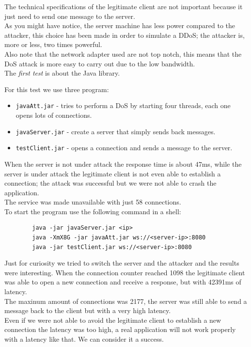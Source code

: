 	The technical specifications of the legitimate client are not important because it just need to send one message to the server.\\
	As you might have notice, the server machine has less power compared to the attacker, this choice has been made in order to simulate a DDoS;
	the attacker is, more or less, two times powerful.\\
	Also note that the network adapter used are not top notch, this means that the DoS attack is more easy to carry out due to the low bandwidth.\\

	The \emph{first test} is about the Java library.

	For this test we use three program:
	\begin{itemize}
		\item \texttt{javaAtt.jar} - tries to perform a DoS by starting four threads, each one opens lots of connections.
		\item \texttt{javaServer.jar} - create a server that simply sends back messages.
		\item \texttt{testClient.jar} - opens a connection and sends a message to the server. 
	\end{itemize}

	When the server is not under attack the response time is about 47ms, while the server is under attack the legitimate client is not even able to
	establish a connection; the attack was successful but we were not able to crash the application.\\
	The service was made unavailable with just 58 connections.\\

	To start the program use the following command in a shell:
	\begin{lstlisting}
		java -jar javaServer.jar <ip>
		java -XmX8G -jar javaAtt.jar ws://<server-ip>:8080
		java -jar testClient.jar ws://<server-ip>:8080
	\end{lstlisting}

	Just for curiosity we tried to switch the server and the attacker and the results were interesting. When the connection counter reached 1098
	the legitimate client was able to open a new connection and receive a response, but with 42391ms of latency.\\
	The maxinum amount of connections was 2177, the server was still able to send a message back to the client but with a very high latency.\\
	Even if we were not able to avoid the legitimate client to establish a new connection the latency was too high, a real application
	will not work properly with a latency like that. We can consider it a success.\\


